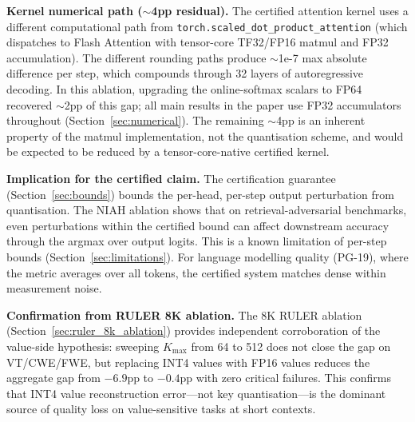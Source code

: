 \documentclass[10pt,twocolumn,a4paper]{article}
\theoremstyle{definition}
\theoremstyle{remark}
\newcommand{\torchsdpa}{\texttt{torch.scaled\_\hspace{0pt}dot\_\hspace{0pt}product\_\hspace{0pt}attention}}
\begin{document}
\textbf{Kernel numerical path ($\sim$4pp residual).}  The certified attention kernel uses a different computational path from \torchsdpa{} (which dispatches to Flash Attention with tensor-core TF32/FP16 matmul and FP32 accumulation).  The different rounding paths produce $\sim$1e-7 max absolute difference per step, which compounds through 32 layers of autoregressive decoding.  In this ablation, upgrading the online-softmax scalars to FP64 recovered $\sim$2pp of this gap; all main results in the paper use FP32 accumulators throughout (Section~\ref{sec:numerical}).  The remaining $\sim$4pp is an inherent property of the matmul implementation, not the quantisation scheme, and would be expected to be reduced by a tensor-core-native certified kernel.

\textbf{Implication for the certified claim.}  The certification guarantee (Section~\ref{sec:bounds}) bounds the per-head, per-step output perturbation from quantisation.  The NIAH ablation shows that on retrieval-adversarial benchmarks, even perturbations within the certified bound can affect downstream accuracy through the argmax over output logits.  This is a known limitation of per-step bounds (Section~\ref{sec:limitations}).  For language modelling quality (PG-19), where the metric averages over all tokens, the certified system matches dense within measurement noise.

\textbf{Confirmation from RULER 8K ablation.}  The 8K RULER ablation (Section~\ref{sec:ruler_8k_ablation}) provides independent corroboration of the value-side hypothesis: sweeping $K_{\max}$ from 64 to 512 does not close the gap on VT/CWE/FWE, but replacing INT4 values with FP16 values reduces the aggregate gap from $-6.9$pp to $-0.4$pp with zero critical failures.  This confirms that INT4 value reconstruction error---not key quantisation---is the dominant source of quality loss on value-sensitive tasks at short contexts.
\end{document}
